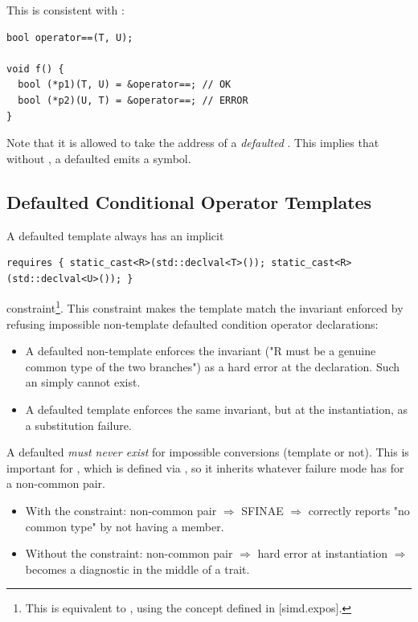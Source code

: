 This is consistent with :
\medskip\begin{lstlisting}
bool operator==(T, U);

void f() {
  bool (*p1)(T, U) = &operator==; // OK
  bool (*p2)(U, T) = &operator==; // ERROR
}
\end{lstlisting}

Note that it is allowed to take the address of a \emph{defaulted} .
This implies that without , a defaulted  emits a symbol.

\subsection{Defaulted Conditional Operator Templates}
A defaulted  template always has an implicit
\medskip\begin{lstlisting}
requires { static_cast<R>(std::declval<T>()); static_cast<R>(std::declval<U>()); }
\end{lstlisting}
constraint\footnote{%
  This is equivalent to , using the concept defined in [simd.expos].
}.
This constraint makes the template match the invariant enforced by refusing
impossible non-template defaulted condition operator declarations:
\begin{itemize}
  \item A defaulted  non-template enforces the invariant ("R
    must be a genuine common type of the two branches") as a hard error at the
    declaration. Such an  simply cannot exist.
  \item A defaulted  template enforces the same invariant, but
    at the instantiation, as a substitution failure.
\end{itemize}

A defaulted  \emph{must never exist} for impossible
conversions (template or not).
This is important for , which is defined via ,
so it inherits whatever failure mode  has for a non-common pair.
\begin{itemize}
  \item With the constraint: non-common pair $\Rightarrow$ SFINAE $\Rightarrow$
     correctly reports "no common type" by not having a
     member.
  \item Without the constraint: non-common pair $\Rightarrow$ hard error at
    instantiation $\Rightarrow$  becomes a diagnostic in the
    middle of a trait.
\end{itemize}

